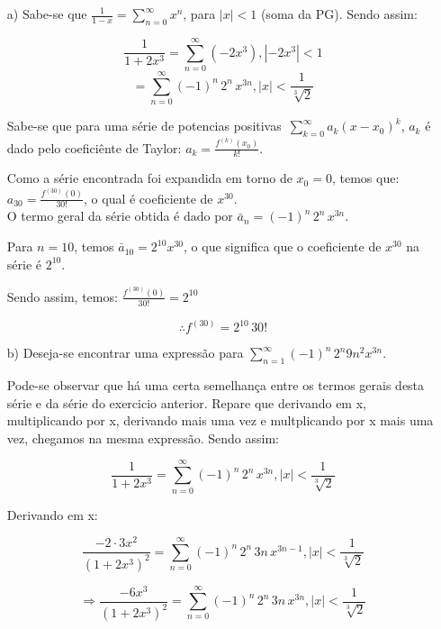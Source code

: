 \documentclass[12pt,a4paper]{article}
\begin{document}
\begin{itemize}
    \item[a)] Sabe-se que $ \displaystyle\frac{1}{1-x} = \displaystyle\sum_{n=0}^\infty x^n $, para $|x|<1$ (soma da PG). Sendo assim:
    
    $$\frac{1}{1 + 2x^3} = \sum_{n=0}^\infty (-2 x^3), |-2x^3| < 1$$
    $$ = \sum_{n=0}^\infty (-1)^n  \, 2^n \, x^{3n}, |x| < \frac{1}{\sqrt[3]{2}} $$
    
    
    Sabe-se que para uma série de potencias positivas $ \, \displaystyle\sum_{k=0}^\infty a_k (x-x_0)^k $, $a_k$ é dado pelo coeficiênte de Taylor: $a_k = \displaystyle\frac{f^{(k)}(x_0)}{k!}$.
    
    Como a série encontrada foi expandida em torno de $x_0 = 0$, temos que: $a_{30} = \displaystyle\frac{f^{(30)}(0)}{30!}$, o qual é coeficiente de $x^{30}$. \\
    
    O termo geral da série obtida é dado por $ \bar{a}_n = (-1)^n  \, 2^n \, x^{3n}$.
    
    Para $n=10$, temos $\bar{a}_{10} = 2^{10} x^{30}$, o que significa que o coeficiente de $x^{30}$ na série é $2^{10}$.
    
    Sendo assim, temos: $ \displaystyle\frac{f^{(30)}(0)}{30!} = 2^{10} $
    
    $$ \therefore f^{(30)} = 2^{10} \, 30! $$


    \item[b)] Deseja-se encontrar uma expressão para $\displaystyle\sum_{n=1}^\infty (-1)^n \, 2^n 9 n^2 x^{3n}$.
    
     Pode-se observar que há uma certa semelhança entre os termos gerais desta série e da série do exercicio anterior. Repare que derivando em x, multiplicando por x, derivando mais uma vez e multplicando por x mais uma vez, chegamos na mesma expressão. Sendo assim:
     
     $$\frac{1}{1 + 2x^3} =  \sum_{n=0}^\infty (-1)^n  \, 2^n \, x^{3n}, |x| < \frac{1}{\sqrt[3]{2}} $$
     
     Derivando em x:
     
     $$\frac{-2 \cdot 3 x^2}{(1 + 2x^3)^2} =  \sum_{n=0}^\infty (-1)^n  \, 2^n \, 3 n \, x^{3n-1}, |x| < \frac{1}{\sqrt[3]{2}} $$
     
     $$ \Rightarrow \frac{-6 x^3}{(1 + 2x^3)^2} =  \sum_{n=0}^\infty (-1)^n  \, 2^n \, 3 n \, x^{3n}, |x| < \frac{1}{\sqrt[3]{2}} $$
     

\end{itemize}
\end{document}
